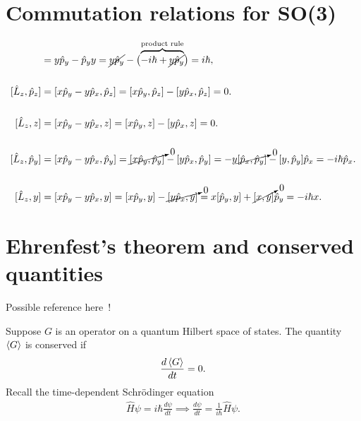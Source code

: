 \section{Commutation relations for SO(3)}\label{sec:SO3_comms}
\begin{align*}
    [y,\hat{p}_y] &= y\hat{p}_y - \hat{p}_y y = \cancel{y\hat{p}_y} - \bigl(\overbrace{-i\hbar + \cancel{y\hat{p}_y}}^{\textrm{product rule}}\bigr) = i\hbar, \\
    \\
    [\hat{L}_z,\hat{p}_z]
        &= [x\hat{p}_y - y\hat{p}_x, \hat{p}_z] = [x\hat{p}_y, \hat{p}_z] - [y\hat{p}_x, \hat{p}_z] = 0. \\
    \\
    [\hat{L}_z, z] &= [x\hat{p}_y - y\hat{p}_x, z] = [x\hat{p}_y, z] - [y\hat{p}_x, z] = 0. \\
    \\
    [\hat{L}_z,\hat{p}_y] 
        &= [x\hat{p}_y - y\hat{p}_x, \hat{p}_y] = \cancelto{0}{[x\hat{p}_y, \hat{p}_y]} - [y\hat{p}_x, \hat{p}_y] = -y\cancelto{0}{[\hat{p}_x, \hat{p}_y]} - [y, \hat{p}_y]\hat{p}_x = -i\hbar\hat{p}_x. \\
    \\
    [\hat{L}_z, y] &= [x\hat{p}_y - y\hat{p}_x, y] = [x\hat{p}_y, y] - \cancelto{0}{[y\hat{p}_x, y]} = x[\hat{p}_y, y] + \cancelto{0}{[x, y]}\hat{p}_y = -i\hbar x.
\end{align*}

\section{Ehrenfest's theorem and conserved quantities}\label{sec:conserved_quantities}


    Possible reference here~\cite{Hall2013}!
    
    Suppose $G$ is an operator on a quantum Hilbert space of states. The quantity $\braket{G}$ is conserved if
    \begin{align*}
        \frac{d\braket{G}}{dt} = 0.
    \end{align*}
    Recall the time-dependent Schr\"odinger equation
    \begin{align*}
        \hat{H}\psi = i\hbar\frac{d\psi}{dt} \implies \frac{d\psi}{dt} = \frac{1}{i\hbar}\hat{H}\psi.
    \end{align*}

